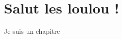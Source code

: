 \newcommand{\nationclass}{book}






\maketitle
\tableofcontents 

\chapter{Salut les loulou !}
Je suis un chapitre
\lipsum[1-150]


